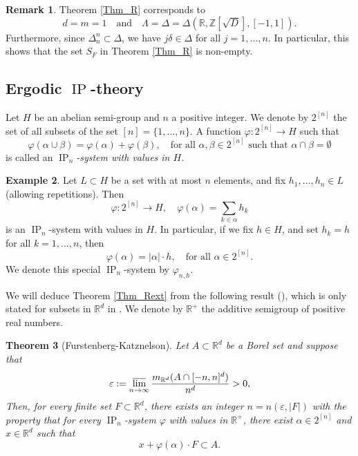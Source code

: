 \documentclass[12pt,reqno,a4paper]{amsart}
\numberwithin{equation}{section}
\newcommand{\bR}{\mathbb{R}}
\newcommand{\bZ}{\mathbb{Z}}
\newcommand{\ra}{\rightarrow}
\newcommand{\qand}{\quad \textrm{and} \quad}
\newcommand{\eps}{\varepsilon}
\DeclareMathOperator{\IP}{IP}
\theoremstyle{theorem}
\newtheorem{theorem}{Theorem}[section]
\theoremstyle{task}
\theoremstyle{definition}
\newtheorem{remark}[theorem]{Remark}
\newtheorem{example}[theorem]{Example}
\begin{document}
\begin{remark}
Theorem \ref{Thm_R} corresponds to 
\[
d = m = 1 \qand \Lambda = \Delta = \Delta(\bR,\bZ[\sqrt{D}],[-1,1]).
\]
Furthermore, since $\Delta_n^n \subset \Delta$, we have $j\delta \in \Delta$ for all $j =1,\ldots,n$. In particular, this shows that the set $S_F$ in Theorem \ref{Thm_R} is non-empty.
\end{remark}

\subsection*{Ergodic $\IP$-theory}

Let $H$ be an abelian semi-group and $n$ a positive integer. We denote by $2^{[n]}$
the set of all subsets of the set $[n] = \{1,\ldots,n\}$. A function 
$\varphi : 2^{[n]} \ra H$ such that
\[
\varphi(\alpha \cup \beta) = \varphi(\alpha) + \varphi(\beta), \quad 
\textrm{for all $\alpha, \beta \in 2^{[n]}$ such that $\alpha \cap \beta = \emptyset$}
\]
is called an \emph{$\IP_n$-system with values in $H$}. 

\begin{example}
Let $L \subset H$ be a set with at most $n$ elements, and fix $h_1,\ldots,h_n \in L$ (allowing repetitions). Then 
\[
\varphi : 2^{[n]} \ra H, \quad \varphi(\alpha) = \sum_{k \in \alpha} h_{k}
\]
is an $\IP_n$-system with values in $H$. In particular, if we fix $h \in H$, and
set $h_k = h$ for all $k=1,\ldots,n$, then
\[
\varphi(\alpha) = |\alpha| \cdot h, \quad \textrm{for all $\alpha \in 2^{[n]}$}.
\]
We denote this special $\IP_n$-system by $\varphi_{n,h}$.
\end{example}

We will deduce Theorem \ref{Thm_Rext} from the following result (\cite[Theorem 9.5]{FK2}), which is only stated for subsets in $\bR^d$ in \cite{FK2}. We denote by $\bR^{+}$
the additive semigroup of positive real numbers.

\begin{theorem}[Furstenberg-Katznelson]
\label{ThmFK}
Let $A \subset \bR^d$ be a Borel set and suppose that 
\[
\eps := \varlimsup_{n \ra \infty} \frac{m_{\bR^d}(A \cap [-n,n]^d)}{n^d} > 0,
\]
Then, for every finite set $F \subset \bR^d$, there exists an integer $n = n(\eps,|F|)$ with the property that for every 
$\IP_n$-system $\varphi$ with values in $\bR^{+}$, there exist $\alpha \in 2^{[n]}$ and $x \in \bR^d$ such that 
\[
x + \varphi(\alpha) \cdot F \subset A.
\]
\end{theorem}
\end{document}
